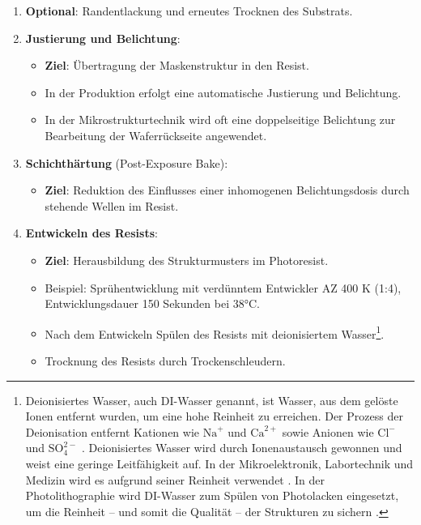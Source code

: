 \documentclass{article} %
\begin{document}
\begin{enumerate}
    \item \textbf{Optional}: Randentlackung und erneutes Trocknen des Substrats.

    \item \textbf{Justierung und Belichtung}:
    \begin{itemize}
        \item \textbf{Ziel}: Übertragung der Maskenstruktur in den Resist.
        \item In der Produktion erfolgt eine automatische Justierung und Belichtung.
        \item In der Mikrostrukturtechnik wird oft eine doppelseitige Belichtung zur Bearbeitung der Waferrückseite angewendet.
    \end{itemize}

    \item \textbf{Schichthärtung} (Post-Exposure Bake):
    \begin{itemize}
        \item \textbf{Ziel}: Reduktion des Einflusses einer inhomogenen Belichtungsdosis durch stehende Wellen im Resist.
    \end{itemize}

    \item \textbf{Entwickeln des Resists}:
    \begin{itemize}
        \item \textbf{Ziel}: Herausbildung des Strukturmusters im Photoresist.
        \item Beispiel: Sprühentwicklung mit verdünntem Entwickler AZ 400 K (1:4), Entwicklungsdauer 150 Sekunden bei 38°C.
        \item Nach dem Entwickeln Spülen des Resists mit deionisiertem Wasser\footnote{Deionisiertes Wasser, auch DI-Wasser genannt, ist Wasser, aus dem gelöste Ionen entfernt wurden, um eine hohe Reinheit zu erreichen. Der Prozess der Deionisation entfernt Kationen wie $\mathrm{Na}^+$ und $\mathrm{Ca}^{2+}$ sowie Anionen wie $\mathrm{Cl}^-$ und $\mathrm{SO}_4^{2-}$ \cite{swatchuk2008, weast2004}. Deionisiertes Wasser wird durch Ionenaustausch gewonnen und weist eine geringe Leitfähigkeit auf. In der Mikroelektronik, Labortechnik und Medizin wird es aufgrund seiner Reinheit verwendet \cite{handbook2007}. In der Photolithographie wird DI-Wasser zum Spülen von Photolacken eingesetzt, um die Reinheit -- und somit die Qualität --  der Strukturen zu sichern \cite{peeters1994}.}.    
        \item Trocknung des Resists durch Trockenschleudern.
    \end{itemize}


\end{enumerate}
\end{document}
